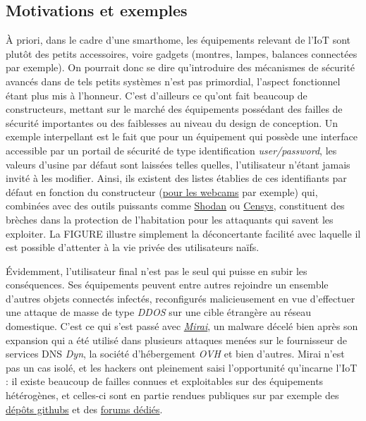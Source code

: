 \documentclass[]{article}
\begin{document}
\subsection{Motivations et exemples}

À priori, dans le cadre d'une smarthome, les équipements relevant de l'IoT sont plutôt des petits accessoires, voire gadgets (montres, lampes, balances connectées par exemple). On pourrait donc se dire qu'introduire des mécanismes de sécurité avancés dans de tels petits systèmes n'est pas primordial, l'aspect fonctionnel étant plus mis à l'honneur. C'est d'ailleurs ce qu'ont fait beaucoup de constructeurs, mettant sur le marché des équipements possédant des failles de sécurité importantes ou des faiblesses au niveau du design de conception. Un exemple interpellant est le fait que pour un équipement qui possède une interface accessible par un portail de sécurité de type identification \textit{user/password}, les valeurs d'usine par défaut sont laissées telles quelles, l'utilisateur n'étant jamais invité à les modifier. Ainsi, ils existent des listes établies de ces identifiants par défaut en fonction du constructeur (\href{https://www.ispyconnect.com/userguide-default-passwords.aspx}{pour les webcams} par exemple) qui, combinées avec des outils puissants comme \href{https://www.shodan.io/}{Shodan} ou \href{https://censys.io/}{Censys}, constituent des brèches dans la protection de l'habitation pour les attaquants qui savent les exploiter. La FIGURE illustre simplement la déconcertante facilité avec laquelle il est possible d'attenter à la vie privée des utilisateurs naïfs.\\


\par Évidemment, l'utilisateur \og final \fg n'est pas le seul qui puisse en subir les conséquences. Ses équipements peuvent entre autres rejoindre un ensemble d'autres  objets connectés infectés, reconfigurés malicieusement en vue d'effectuer une attaque de masse de type \textit{DDOS} sur une cible étrangère au réseau domestique. C'est ce qui s'est passé avec \href{https://en.wikipedia.org/wiki/Mirai_(malware)}{\textit{Mirai}}, un malware décelé bien après son expansion qui a été utilisé dans plusieurs attaques menées sur le fournisseur de services DNS \textit{Dyn}, la société d'hébergement \textit{OVH} et bien d'autres. Mirai n'est pas un cas isolé, et les hackers ont pleinement saisi l'opportunité qu'incarne l'IoT : il existe beaucoup de failles connues et exploitables sur des équipements hétérogènes, et celles-ci sont en partie rendues publiques sur par exemple des \href{https://github.com/nebgnahz/awesome-iot-hacks}{dépôts githubs} et des \href{https://hackforums.net/forumdisplay.php?fid=193}{forums dédiés}.\\
\end{document}
